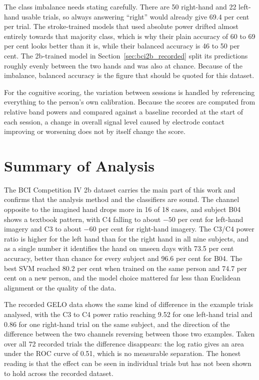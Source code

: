 The class imbalance needs stating carefully. There are 50 right-hand and 22 left-hand
usable trials, so always answering ``right'' would already give 69.4 per cent per trial.
The stroke-trained models that used absolute power drifted almost entirely towards that
majority class, which is why their plain accuracy of 60 to 69 per cent looks better than
it is, while their balanced accuracy is 46 to 50 per cent. The 2b-trained model in
Section~\ref{sec:bci2b_recorded} split its predictions roughly evenly between the two
hands and was also at chance. Because of the imbalance, balanced accuracy is the figure
that should be quoted for this dataset.

For the cognitive scoring, the variation between sessions is handled by referencing
everything to the person's own calibration. Because the scores are computed from relative
band powers and compared against a baseline recorded at the start of each session, a change
in overall signal level caused by electrode contact improving or worsening does not by
itself change the score.

\section{Summary of Analysis}

The BCI Competition IV 2b dataset carries the main part of this work and confirms that the
analysis method and the classifiers are sound. The
channel opposite to the imagined hand drops more in 16 of 18 cases, and subject B04 shows a
textbook pattern, with C4 falling to about $-50$ per cent for left-hand imagery and C3 to
about $-60$ per cent for right-hand imagery. The C3/C4 power ratio is higher for the left
hand than for the right hand in all nine subjects, and as a single number it identifies
the hand on unseen days with 73.5 per cent accuracy, better than chance for every subject
and 96.6 per cent for B04. The best SVM reached 80.2 per cent when trained on the same
person and 74.7 per cent on a new person, and the model choice mattered far less than
Euclidean alignment or the quality of the data.

The recorded GELO data shows the same kind of difference in the example trials analysed,
with the C3 to C4 power ratio reaching 9.52 for one left-hand trial and 0.86 for one
right-hand trial on the same subject, and the direction of the difference between the two
channels reversing between those two examples. Taken over all 72 recorded trials the
difference disappears: the log ratio gives an area under the ROC curve of 0.51, which is
no measurable separation. The honest reading is that the effect can be seen in individual
trials but has not been shown to hold across the recorded dataset.

